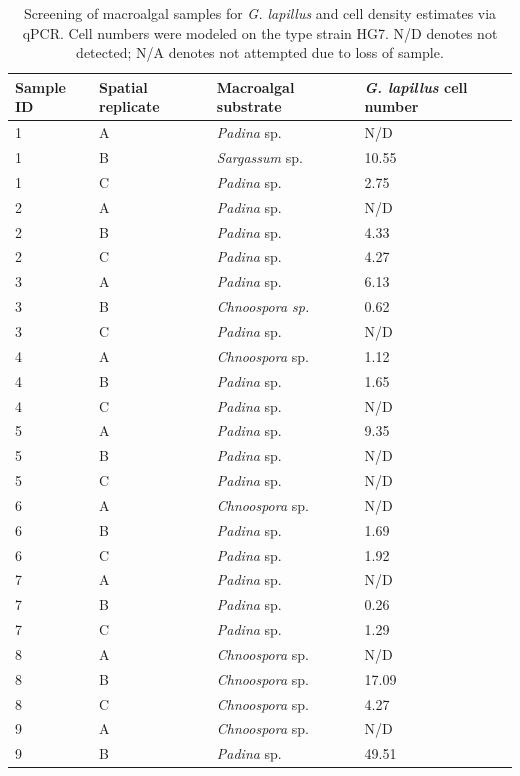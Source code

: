 \documentclass[10pt,letterpaper]{article}
\begin{document}
\begin{longtable}{ | p{2cm} | p{2cm} | p{3cm} | p{3.5cm} |}
\caption{Screening of macroalgal samples for \emph{G. lapillus} and cell density estimates via qPCR. Cell numbers were modeled on the type strain HG7. N/D denotes not detected; N/A denotes not attempted due to loss of sample.}\\
\hline
\label{tbl:MacroalgaeTable}
\textbf{Sample ID}&\textbf{Spatial replicate}&\textbf{Macroalgal substrate}&\textbf{\textit{G. lapillus} cell number}\\
\hline
1&A&\emph{Padina} sp.&N/D\\
\hline
1&B&\emph{Sargassum} sp.&10.55
\\
\hline
1&C&\emph{Padina} sp.&2.75
\\
\hline
2&A&\emph{Padina} sp.&N/D\\
\hline
2&B&\emph{Padina} sp. 
&4.33\\
\hline
2&C&\emph{Padina} sp.&4.27\\
\hline
3&A&\emph{Padina} sp. %
&6.13 %
\\
\hline
3&B&\emph{Chnoospora sp.}&0.62
\\
\hline
3&C&\emph{Padina} sp. 
&N/D\\
\hline
4&A&\emph{Chnoospora} sp.&1.12 
\\
\hline
4&B&\emph{Padina} sp.&1.65
\\
\hline
4&C&\emph{Padina} sp.&N/D\\
\hline
5
&A&\emph{Padina} sp.&9.35\\
\hline
5
&B&\emph{Padina} sp.&N/D\\
\hline
5
&C&\emph{Padina} sp.&N/D\\
\hline
6&A& 
\emph{Chnoospora} sp.&N/D\\
\hline
6&B&\emph{Padina} sp.&1.69
\\
\hline
6&C&\emph{Padina} sp.&1.92
\\
\hline
7  
&A&
\emph{Padina} sp. 
&N/D\\
\hline
7 
&B&\emph{Padina} sp. 
&0.26\\
\hline
7 
&C&\emph{Padina} sp. 
&1.29\\
\hline
8&A&\emph{Chnoospora} sp.&N/D\\ 
\hline
8&B&\emph{Chnoospora} sp.&17.09
\\
\hline
8&C&\emph{Chnoospora} sp.&4.27
\\
\hline
9&A&\emph{Chnoospora} sp.&N/D\\
\hline
9&B&\emph{Padina} sp. 
&49.51
\\

\end{longtable}
\end{document}
